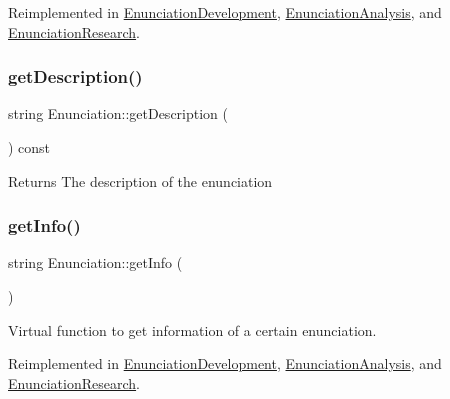 Reimplemented in \hyperlink{class_enunciation_development_aa0e2d2c396cc3ec68df31334ae475850}{Enunciation\+Development}, \hyperlink{class_enunciation_analysis_a8393cb5e4c7a096f09e1112dbc854cf8}{Enunciation\+Analysis}, and \hyperlink{class_enunciation_research_a424e392956c1c7bbccfdf74d72b3d4dd}{Enunciation\+Research}.

\mbox{\label{class_enunciation_a8f5a6300cf6eb691ca1600191bf20e5e}} 
\subsubsection{\texorpdfstring{get\+Description()}{getDescription()}}
{\footnotesize\ttfamily string Enunciation\+::get\+Description (\begin{DoxyParamCaption}{ }\end{DoxyParamCaption}) const}

\begin{DoxyReturn}{Returns}
The description of the enunciation 
\end{DoxyReturn}
\mbox{\label{class_enunciation_a032b5ff494595ab52d152d605544525c}} 
\subsubsection{\texorpdfstring{get\+Info()}{getInfo()}}
{\footnotesize\ttfamily string Enunciation\+::get\+Info (\begin{DoxyParamCaption}{ }\end{DoxyParamCaption})\hspace{0.3cm}{\ttfamily [virtual]}}



Virtual function to get information of a certain enunciation. 



Reimplemented in \hyperlink{class_enunciation_development_a06289f811338e030977e59f083c618b6}{Enunciation\+Development}, \hyperlink{class_enunciation_analysis_a6cc8894f92eecbb68a7ebeb4a8365896}{Enunciation\+Analysis}, and \hyperlink{class_enunciation_research_a57ce30430703246bdd6a1103530a8a5f}{Enunciation\+Research}.

\mbox{\label{class_enunciation_a8fe49ff095b219adb6841976b8983ebe}} 
